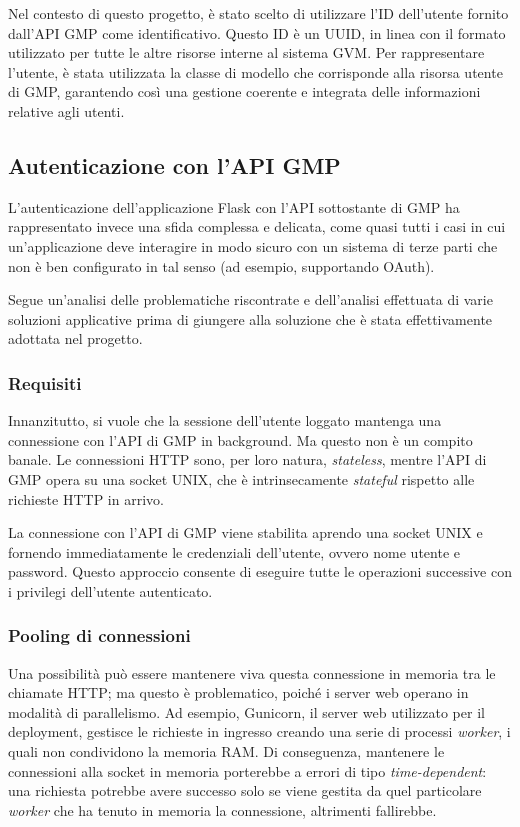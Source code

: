 Nel contesto di questo progetto, è stato scelto di utilizzare l'ID dell'utente fornito dall'API GMP come identificativo. Questo ID è un UUID, in linea con il formato utilizzato per tutte le altre risorse interne al sistema GVM. Per rappresentare l'utente, è stata utilizzata la classe di modello che corrisponde alla risorsa utente di GMP, garantendo così una gestione coerente e integrata delle informazioni relative agli utenti.

\subsection{Autenticazione con l'API GMP}
L'autenticazione dell'applicazione Flask con l'API sottostante di GMP ha rappresentato invece una sfida complessa e delicata, come quasi tutti i casi in cui un'applicazione deve interagire in modo sicuro con un sistema di terze parti che non è ben configurato in tal senso (ad esempio, supportando OAuth).

Segue un'analisi delle problematiche riscontrate e dell'analisi effettuata di varie soluzioni applicative prima di giungere alla soluzione che è stata effettivamente adottata nel progetto.

\subsubsection{Requisiti}
Innanzitutto, si vuole che la sessione dell'utente loggato mantenga una connessione con l'API di GMP in background. Ma questo non è un compito banale. Le connessioni HTTP sono, per loro natura, \emph{stateless}, mentre l'API di GMP opera su una socket UNIX, che è intrinsecamente \emph{stateful} rispetto alle richieste HTTP in arrivo.

La connessione con l'API di GMP viene stabilita aprendo una socket UNIX e fornendo immediatamente le credenziali dell'utente, ovvero nome utente e password. Questo approccio consente di eseguire tutte le operazioni successive con i privilegi dell'utente autenticato.

\subsubsection{Pooling di connessioni}
Una possibilità può essere mantenere viva questa connessione in memoria tra le chiamate HTTP; ma questo è problematico, poiché i server web operano in modalità di parallelismo. Ad esempio, Gunicorn, il server web utilizzato per il deployment, gestisce le richieste in ingresso creando una serie di processi \emph{worker}, i quali non condividono la memoria RAM. Di conseguenza, mantenere le connessioni alla socket in memoria porterebbe a errori di tipo \emph{time-dependent}: una richiesta potrebbe avere successo solo se viene gestita da quel particolare \emph{worker} che ha tenuto in memoria la connessione, altrimenti fallirebbe.

